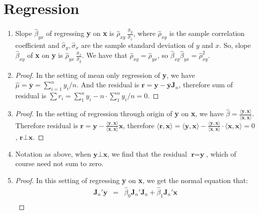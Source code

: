 \documentclass[12pt]{article}
\begin{document}
\section{Regression}

\begin{enumerate}
    \item 
    Slope $\hat{\beta}_{yx}$ of regressing \textbf{y} on \textbf{x} is $\hat{\rho}_{xy}\ \frac{\hat{\sigma}_y}{\hat{\sigma}_x}$, where $\hat{\rho}_{xy}$ is the sample correlation coefficient and $\hat{\sigma}_y, \hat{\sigma}_x$ are the sample standard deviation of $y$ and $x$.
    So, slope $\hat{\beta}_{xy}$ of \textbf{x} on \textbf{y} is $\hat{\rho}_{yx}\ \frac{\hat{\sigma}_x}{\hat{\sigma}_y}$.
    We have that $\hat{\rho}_{xy} = \hat{\rho}_{yx}$, so $\hat{\beta}_{xy} \hat{\beta}_{yx} = \hat{\rho}_{xy}^2$.
    \item
    \begin{proof}
        In the setting of mean only regression of \textbf{y}, we have $\hat{\mu} = \overline{\textbf{y}} = \sum_{i=1}^n y_i / n$.
        And the residual is $\textbf{r} = \textbf{y} - \overline{\textbf{y}} \textbf{J}_n$, therefore sum of residual is $\sum r_i = \sum_1^n y_i - n \cdot \sum_1^n y_i / n = 0$.
    \end{proof}
    \item
    \begin{proof}
        In the setting of regression through origin of \textbf{y} on \textbf{x}, we have $\hat{\beta} = \frac{\langle \textbf{y}, \textbf{x} \rangle}{\langle \textbf{x}, \textbf{x} \rangle}$.
        Therefore residual is $\textbf{r} = \textbf{y} - \frac{\langle \textbf{y}, \textbf{x} \rangle}{\langle \textbf{x}, \textbf{x} \rangle} \textbf{x}$, therefore $\langle \textbf{r}, \textbf{x} \rangle = \langle \textbf{y}, \textbf{x} \rangle - \frac{\langle \textbf{y}, \textbf{x} \rangle}{\langle \textbf{x}, \textbf{x} \rangle}\cdot\langle \textbf{x}, \textbf{x} \rangle = 0$, $\textbf{r} \bot \textbf{x}$.
    \end{proof}
    \item
    Notation as above, when $\textbf{y} \bot \textbf{x}$, we find that the residual $\textbf{r} = \textbf{y}$, which of course need not sum to zero.
    \item
    \begin{proof}
        In this setting of regressing \textbf{y} on \textbf{x}, we get the normal equation that:
        \begin{eqnarray}
            \textbf{J}_n'\textbf{y} &=& \hat{\beta}_0 \textbf{J}_n'\textbf{J}_n + \hat{\beta}_1 \textbf{J}_n'\textbf{x} \\

\end{eqnarray}
\end{proof}
\end{enumerate}
\end{document}
